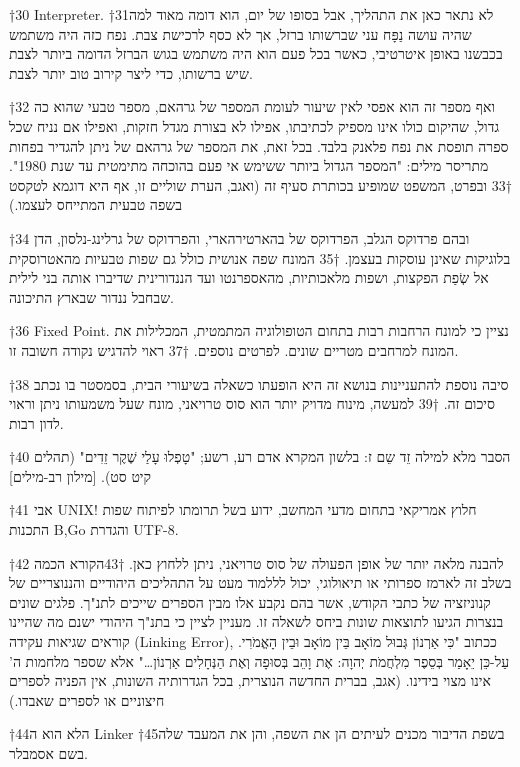 \begin{טבלא}[!htbp]
†{30} Interpreter.
†{31}לא נתאר כאן את התהליך, אבל בסופו של יום, הוא דומה מאוד למה שהיה עושה נַפָּח עני שברשותו ברזל, אך לא כסף לרכישת צבת. נפח כזה היה משתמש בכבשנו באופן איטרטיבי, כאשר בכל פעם הוא היה משתמש בגוש הברזל הדומה ביותר לצבת שיש ברשותו, כדי ליצר קירוב טוב יותר לצבת.

†{32} ואף מספר זה הוא אפסי לאין שיעור לעומת המספר של גרהאם, מספר טבעי שהוא כה גדול, שהיקום כולו אינו מספיק לכתיבתו, אפילו לא בצורת מגדל חזקות, ואפילו אם נניח שכל ספרה תופסת את נפח פלאנק בלבד. בכל זאת, את המספר של גרהאם של ניתן להגדיר בפחות מתריסר מילים: "המספר הגדול ביותר ששימש אי פעם בהוכחה מתימטית עד שנת 1980".
†{33} ובפרט, המשפט שמופיע בכותרת סעיף זה (ואגב, הערת שוליים זו, אף היא דוגמא לטקסט בשפה טבעית המתייחס לעצמו.)

†{34} ובהם פרדוקס הגלב, הפרדוקס של בהארטירהארי, והפרדוקס של גרלינג-נלסון, הדן בלוגיקות שאינן עוסקות בעצמן.
†{35} המונח שפה אנושית כולל גם שפות טבעיות מהאטרוסקית אל שְׂפַת הפקצות, ושפות מלאכותיות, מהאספרנטו ועד הננדורינית שדיברו אותה בני לילית שבחבל ננדור שבארץ התיכונה.

†{36} Fixed Point. נציין כי למונח הרחבות רבות בתחום הטופולוגיה המתמטית, המכלילות את המונח למרחבים מטריים שונים. לפרטים נוספים.
†{37} ראוי להדגיש נקודה חשובה זו.

†{38} סיבה נוספת להתעניינות בנושא זה היא הופעתו כשאלה בשיעורי הבית, בסמסטר בו נכתב סיכום זה.
†{39} למעשה, מינוח מדויק יותר הוא סוס טרויאני, מונח שעל משמעותו ניתן וראוי לדון רבות.

†{40} הסבר מלא למילה זֵד שֵם ז: בלשון המקרא אדם רע, רשע; "טָפְלוּ עָלַי שֶׁקֶר זֵדִים" (תהלים קיט סט). [מילון רב-מילים]

†{41} אבי UNIX! חלוץ אמריקאי בתחום מדעי המחשב, ידוע בשל תרומתו לפיתוח שפות התכנות B,Go והגדרת UTF-8.

†{42} להבנה מלאה יותר של אופן הפעולה של סוס טרויאני, ניתן ללחוץ כאן.
†{43}הקורא הכמה בשלב זה לארמז ספרותי או תיאולוגי, יכול לללמוד מעט על התהליכים היהודיים והננוצריים של קנוניזציה של כתבי הקודש, אשר בהם נקבע אלו מבין הספרים שייכים לתנ"ך. פלגים שונים בנצרות הגיעו לתוצאות שונות ביחס לשאלה זו. מעניין לציין כי בתנ"ך היהודי ישנם מה שהיינו קוראים שגיאות עקידה (Linking Error), ככתוב "כִּי אַרְנוֹן גְּבוּל מוֹאָב בֵּין מוֹאָב וּבֵין הָאֱמֹרִי. עַל-כֵּן יֵאָמַר בְּסֵפֶר מִלְחֲמֹת יְהוָה: אֶת וָהֵב בְּסוּפָה וְאֶת הַנְּחָלִים אַרְנוֹן…" אלא שספר מלחמות ה' אינו מצוי בידינו. (אגב, בברית החדשה הנוצרית, בכל הגדרותיה השונות, אין הפניה לספרים חיצוניים או לספרים שאבדו.)

†{44}הלא הוא ה Linker
†{45}בשפת הדיבור מכנים לעיתים הן את השפה, והן את המעבד שלה בשם אסמבלר.


\end{טבלא}
